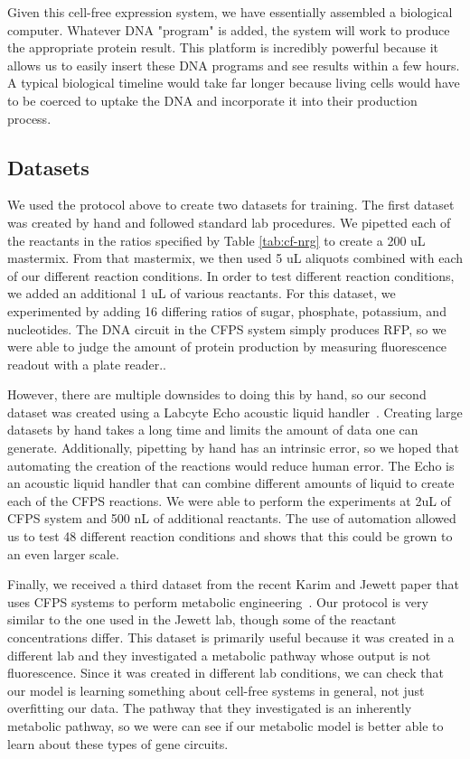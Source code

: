 Given this cell-free expression system, we have essentially assembled a biological computer.
Whatever DNA "program" is added, the system will work to produce the appropriate protein result.
This platform is incredibly powerful because it allows us to easily insert these DNA programs and see results within a few hours.
A typical biological timeline would take far longer because living cells would have to be coerced to uptake the DNA and incorporate it into their production process.


\subsection{Datasets}
We used the protocol above to create two datasets for training.
The first dataset was created by hand and followed standard lab procedures.
We pipetted each of the reactants in the ratios specified by Table \ref{tab:cf-nrg} to create a 200 uL mastermix. 
From that mastermix, we then used 5 uL aliquots combined with each of our different reaction conditions.
In order to test different reaction conditions, we added an additional 1 uL of various reactants.
For this dataset, we experimented by adding 16 differing ratios of sugar, phosphate, potassium, and nucleotides.
The DNA circuit in the CFPS system simply produces RFP, so we were able to judge the amount of protein production by measuring fluorescence readout with a plate reader..

However, there are multiple downsides to doing this by hand, so our second dataset was created using a Labcyte Echo acoustic liquid handler~\cite{TODO}.
Creating large datasets by hand takes a long time and limits the amount of data one can generate.
Additionally, pipetting by hand has an intrinsic error, so we hoped that automating the creation of the reactions would reduce human error.
The Echo is an acoustic liquid handler that can combine different amounts of liquid to create each of the CFPS reactions.
We were able to perform the experiments at 2uL of CFPS system and 500 nL of additional reactants.
The use of automation allowed us to test 48 different reaction conditions and shows that this could be grown to an even larger scale.

Finally, we received a third dataset from the recent Karim and Jewett paper that uses CFPS systems to perform metabolic engineering~\cite{karim2018controlling}.
Our protocol is very similar to the one used in the Jewett lab, though some of the reactant concentrations differ.
This dataset is primarily useful because it was created in a different lab and they investigated a metabolic pathway whose output is not fluorescence.
Since it was created in different lab conditions, we can check that our model is learning something about cell-free systems in general, not just overfitting our data.
The pathway that they investigated is an inherently metabolic pathway, so we were can see if our metabolic model is better able to learn about these types of gene circuits.

